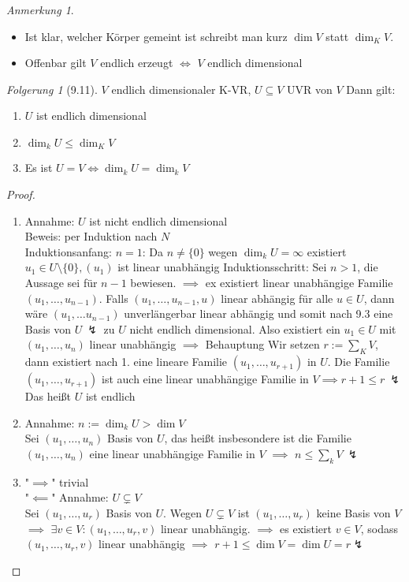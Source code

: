 \documentclass[a4paper]{scrartcl}
\DeclareMathOperator{\Exists}{\exists}
\theoremstyle{definition}
\theoremstyle{plain}
\theoremstyle{plain}
\theoremstyle{remark}
\theoremstyle{remark}
\newtheorem{note}{Anmerkung}
\theoremstyle{remark}
\newtheorem{conc}{Folgerung}
\theoremstyle{remark}
\theoremstyle{remark}
\begin{document}
\begin{note}
\begin{itemize}
\item Ist klar, welcher Körper gemeint ist schreibt man kurz $\dim V$ statt $\dim_K V$.
\item Offenbar gilt $V$ endlich erzeugt $\iff$ $V$ endlich dimensional
\end{itemize}
\end{note}
\begin{conc}[9.11]
$V$ endlich dimensionaler K-VR, $U\subseteq V$ UVR von $V$ Dann gilt:
\begin{enumerate}
\item $U$ ist endlich dimensional
\item $\dim_k U \leq \dim_K V$
\item Es ist $U = V \iff \dim_k U = \dim_k V$
\end{enumerate}
\end{conc}
\begin{proof}
\begin{enumerate}
\item Annahme: $U$ ist nicht endlich dimensional \\
     Beweis: per Induktion nach $N$ \\
     Induktionsanfang: $n = 1$: Da $n\neq \{0\}$ wegen $\dim_k U = \infty$ existiert $u_1 \in U \setminus \{0\}, (u_1)$ ist linear unabhängig
Induktionsschritt: Sei $n > 1$, die Aussage sei für $n - 1$ bewiesen. $\implies$ ex existiert linear unabhängige Familie $(u_1, \ldots, u_{n - 1})$.
Falls $(u_1, \ldots, u_{n - 1}, u)$ linear abhängig für alle $u \in U$, dann wäre $(u_1, \ldots u_{n - 1})$ unverlängerbar linear abhängig und somit nach 9.3 eine Basis von $U~\lightning$ zu $U$ nicht endlich dimensional.
Also existiert ein $u_1 \in U$ mit $(u_1, \ldots, u_n)$ linear unabhängig $\implies$ Behauptung
Wir setzen $r:= \sum_K V$, dann existiert nach 1. eine lineare Familie $(u_1, \ldots, u_{r + 1})$ in $U$. Die Familie $(u_1, \ldots, u_{r + 1})$ ist auch eine linear unabhängige Familie in $V \implies r + 1 \leq r ~ \lightning$ Das heißt $U$ ist endlich
\item Annahme: $n := \dim_k U > \dim V$ \\
     Sei $(u_1, \ldots, u_n)$ Basis von $U$, das heißt insbesondere ist die Familie $(u_1, \ldots, u_n)$ eine linear unabhängige Familie in $V$ $\implies$ $n \leq \sum_k V ~\lightning$
\item "$\implies$" trivial \\
     "$\impliedby$" Annahme: $U \subsetneq V$ \\
     Sei $(u_1, \ldots, u_r)$ Basis von $U$. Wegen $U \subsetneq V$ ist $(u_1, \ldots, u_r)$ keine Basis von $V$ $\implies$ $\Exists v\in V: (u_1, \ldots, u_r, v)$ linear unabhängig.
$\implies$ es existiert $v \in V$, sodass $(u_1, \ldots, u_r, v)$ linear unabhängig $\implies$ $r + 1 \leq \dim V = \dim U = r \lightning$
\end{enumerate}
\end{proof}
\end{document}
